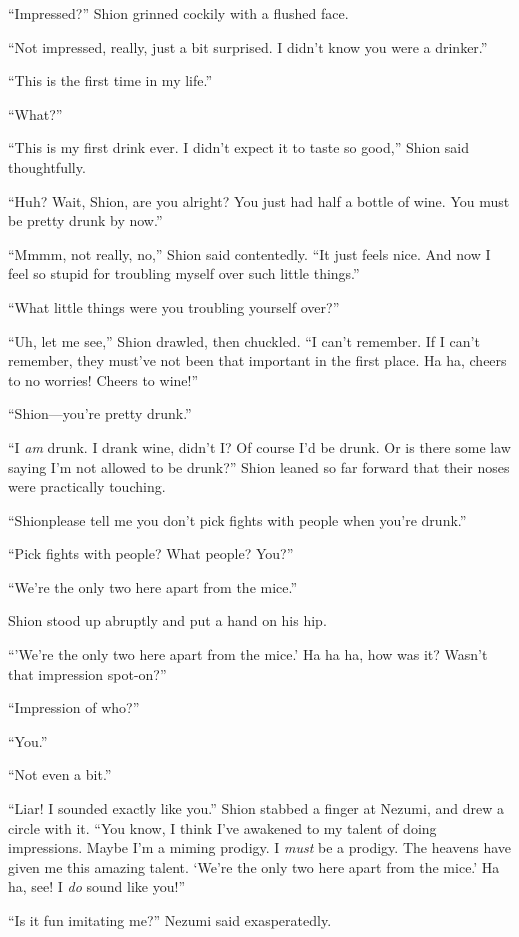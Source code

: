 ``Impressed?'' Shion grinned cockily with a flushed face.

``Not impressed, really, just a bit surprised. I didn't know you were a
drinker.''

``This is the first time in my life.''

``\el What?''

``This is my first drink ever. I didn't expect it to taste so good,''
Shion said thoughtfully.

``Huh? Wait, Shion, are you alright? You just had half a bottle of wine.
You must be pretty drunk by now.''

``Mmmm, not really, no,'' Shion said contentedly. ``It just feels nice.
And now I feel so stupid for troubling myself over such little things.''

``What little things were you troubling yourself over?''

``Uh, let me see,'' Shion drawled, then chuckled. ``I can't remember. If
I can't remember, they must've not been that important in the first
place. Ha ha, cheers to no worries! Cheers to wine!''

``Shion---you're pretty drunk.''

``I \emph{am} drunk. I drank wine, didn't I? Of course I'd be drunk. Or is
there some law saying I'm not allowed to be drunk?'' Shion leaned so far
forward that their noses were practically touching.

``Shion\el please tell me you don't pick fights with people when you're
drunk.''

``Pick fights with people? What people? You?''

``We're the only two here apart from the mice.''

Shion stood up abruptly and put a hand on his hip.

``'We're the only two here apart from the mice.' Ha ha ha, how was it?
Wasn't that impression spot-on?''

``Impression of who?''

``You.''

``Not even a bit.''

``Liar! I sounded exactly like you.'' Shion stabbed a finger at Nezumi,
and drew a circle with it. ``You know, I think I've awakened to my
talent of doing impressions. Maybe I'm a miming prodigy. I \emph{must} be a
prodigy. The heavens have given me this amazing talent. `We're the only
two here apart from the mice.' Ha ha, see! I \emph{do} sound like you!''

``\el Is it fun imitating me?'' Nezumi said exasperatedly.


